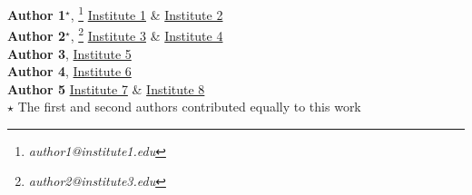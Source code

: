 \textbf{Author 1}$^\star$, \footnote{\textit{author1@institute1.edu}} \href{https://www.authorea.com/inst/}{Institute 1} \& \href{https://www.authorea.com/inst/}{Institute 2}\\ \textbf{Author 2}$^\star$, \footnote{\textit{author2@institute3.edu}} \href{https://www.authorea.com/inst/}{Institute 3} \& \href{https://www.authorea.com/inst/}{Institute 4} \\ \textbf{Author 3}, \href{https://www.authorea.com/inst/}{Institute 5}\\ \textbf{Author 4}, \href{https://www.authorea.com/inst/}{Institute 6} \\ \textbf{Author 5} \href{https://www.authorea.com/inst/}{Institute 7} \& \href{https://www.authorea.com/inst/}{Institute 8}\\ $\star$ The first and second authors contributed equally to this work 